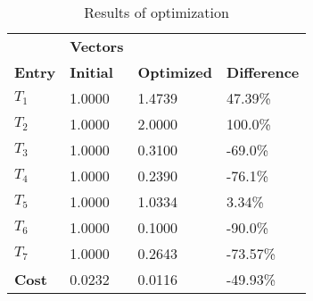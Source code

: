 \begin{table}[H]
\centering
\begin{tabular}{llll}
\textbf{}      & \cellcolor[HTML]{EFEFEF}\textbf{Vectors} & \textbf{} & \textbf{}         \\
\rowcolor[HTML]{EFEFEF} 
\textbf{Entry} & \textbf{Initial} & \textbf{Optimized} & \textbf{Difference} \\
$T_1$ & 1.0000 & 1.4739 & 47.39\% \\ 
$T_2$ & 1.0000 & 2.0000 & 100.0\% \\ 
$T_3$ & 1.0000 & 0.3100 & -69.0\% \\ 
$T_4$ & 1.0000 & 0.2390 & -76.1\% \\ 
$T_5$ & 1.0000 & 1.0334 & 3.34\% \\ 
$T_6$ & 1.0000 & 0.1000 & -90.0\% \\ 
$T_7$ & 1.0000 & 0.2643 & -73.57\% \\ 
\rowcolor[HTML]{EFEFEF} 
\textbf{Cost}  & 0.0232 & 0.0116 & -49.93\% \\ 
\end{tabular}
\caption{Results of optimization}
\label{tab:OptimizationAnalysis}
\end{table}